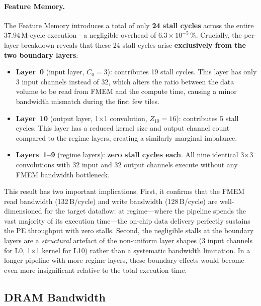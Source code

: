 \paragraph{Feature Memory.}
The Feature Memory introduces a total of only \textbf{24 stall cycles}
across the entire 37.94\,M-cycle execution---a negligible overhead of
$6.3 \times 10^{-5}\,\%$.
Crucially, the per-layer breakdown reveals that these 24 stall cycles
arise \textbf{exclusively from the two boundary layers}:

\begin{itemize}
  \item \textbf{Layer~0} (input layer, $C_0 = 3$): contributes 19
        stall cycles.
        This layer has only 3 input channels instead of 32, which
        alters the ratio between the data volume to be read from FMEM
        and the compute time, causing a minor bandwidth mismatch
        during the first few tiles.
  \item \textbf{Layer~10} (output layer, 1$\times$1 convolution,
        $Z_{10} = 16$): contributes 5 stall cycles.
        This layer has a reduced kernel size and output channel count
        compared to the regime layers, creating a similarly marginal
        imbalance.
  \item \textbf{Layers~1--9} (regime layers): \textbf{zero stall
        cycles each}.
        All nine identical 3$\times$3 convolutions with 32 input and
        32 output channels execute without any FMEM bandwidth
        bottleneck.
\end{itemize}

This result has two important implications.
First, it confirms that the FMEM read bandwidth (132\,B/cycle) and
write bandwidth (128\,B/cycle) are well-dimensioned for the target
dataflow: at regime---where the pipeline spends the vast majority of
its execution time---the on-chip data delivery perfectly sustains the
PE throughput with zero stalls.
Second, the negligible stalls at the boundary layers are a
\emph{structural} artefact of the non-uniform layer shapes (3 input
channels for L0, 1$\times$1 kernel for L10) rather than a systematic
bandwidth limitation.
In a longer pipeline with more regime layers, these boundary effects
would become even more insignificant relative to the total execution
time.


\subsection{DRAM Bandwidth}
\label{sec:val-dram-bw}

